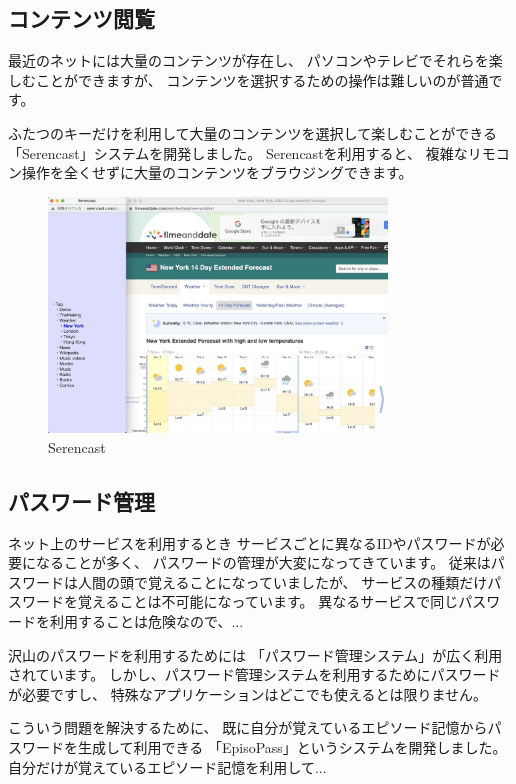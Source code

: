 \documentclass[topics]{compsoft} %
\begin{document}
\subsection{コンテンツ閲覧}

最近のネットには大量のコンテンツが存在し、
パソコンやテレビでそれらを楽しむことができますが、
コンテンツを選択するための操作は難しいのが普通です。

ふたつのキーだけを利用して大量のコンテンツを選択して楽しむことができる
「Serencast」システムを開発しました\cite{seren}。
Serencastを利用すると、
複雑なリモコン操作を全くせずに大量のコンテンツをブラウジングできます。

\begin{figure}[t]
  \includegraphics[width=9cm,bb=0 0 2510 1746]{figures/bb4027e2e210bc16450f0120a2987458.jpg}
  \caption{Serencast}
  \label{example1}
\end{figure}

\subsection{パスワード管理}

ネット上のサービスを利用するとき
サービスごとに異なるIDやパスワードが必要になることが多く、
パスワードの管理が大変になってきています。
従来はパスワードは人間の頭で覚えることになっていましたが、
サービスの種類だけパスワードを覚えることは不可能になっています。
異なるサービスで同じパスワードを利用することは危険なので、...

沢山のパスワードを利用するためには
「パスワード管理システム」が広く利用されています。
しかし、パスワード管理システムを利用するためにパスワードが必要ですし、
特殊なアプリケーションはどこでも使えるとは限りません。

こういう問題を解決するために、
既に自分が覚えているエピソード記憶からパスワードを生成して利用できる
「EpisoPass」というシステムを開発しました。
自分だけが覚えているエピソード記憶を利用して...
\end{document}
